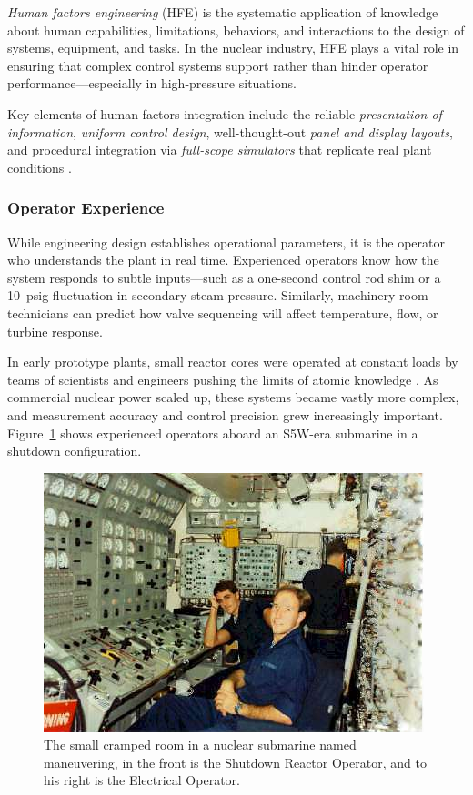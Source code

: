 \documentclass[12pt]{article}
\begin{document}
\textit{Human factors engineering} (HFE) is the systematic application of knowledge about human capabilities, limitations, behaviors, and interactions to the design of systems, equipment, and tasks. In the nuclear industry, HFE plays a vital role in ensuring that complex control systems support rather than hinder operator performance—especially in high-pressure situations.

Key elements of human factors integration include the reliable \textit{presentation of information}, \textit{uniform control design}, well-thought-out \textit{panel and display layouts}, and procedural integration via \textit{full-scope simulators} that replicate real plant conditions \autocite{iec60964, iec964}.

\subsubsection*{Operator Experience}
While engineering design establishes operational parameters, it is the operator who understands the plant in real time. Experienced operators know how the system responds to subtle inputs—such as a one-second control rod shim or a \SI{10}{psig} fluctuation in secondary steam pressure. Similarly, machinery room technicians can predict how valve sequencing will affect temperature, flow, or turbine response.

In early prototype plants, small reactor cores were operated at constant loads
by teams of scientists and engineers pushing the limits of atomic knowledge
\autocite{moderninstruments}. As commercial nuclear power scaled up, these
systems became vastly more complex, and measurement accuracy and control
precision grew increasingly important. Figure~\ref{fig:maneuvering} shows
experienced operators aboard an S5W-era submarine in a shutdown configuration.
\begin{figure}[H]
	\centering
	\includegraphics{maneuvering-watch.jpg}
	\caption{The small cramped room in a nuclear submarine named maneuvering, in
	the front is the Shutdown Reactor Operator, and to his right is the Electrical
Operator.}
	\label{fig:maneuvering}
\end{figure}
\end{document}
